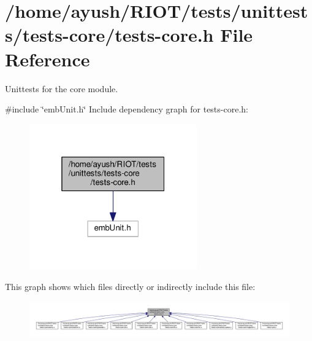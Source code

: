\hypertarget{tests-core_8h}{}\section{/home/ayush/\+R\+I\+O\+T/tests/unittests/tests-\/core/tests-\/core.h File Reference}
\label{tests-core_8h}


Unittests for the {\ttfamily core} module.  


{\ttfamily \#include \char`\"{}emb\+Unit.\+h\char`\"{}}\newline
Include dependency graph for tests-\/core.h\+:
\nopagebreak
\begin{figure}[H]
\begin{center}
\leavevmode
\includegraphics[width=205pt]{tests-core_8h__incl}
\end{center}
\end{figure}
This graph shows which files directly or indirectly include this file\+:
\nopagebreak
\begin{figure}[H]
\begin{center}
\leavevmode
\includegraphics[width=350pt]{tests-core_8h__dep__incl}
\end{center}
\end{figure}
